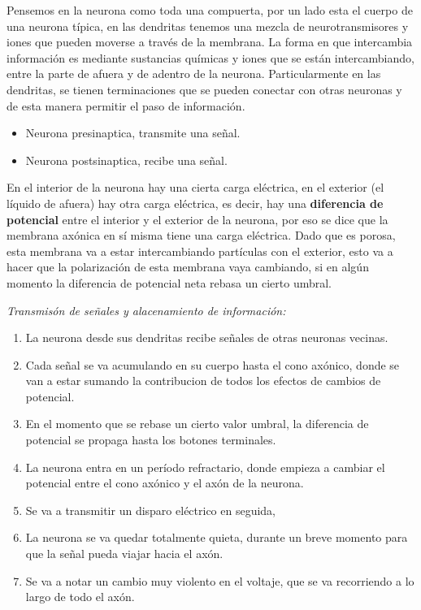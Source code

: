  Pensemos en la neurona como toda una compuerta, por un lado esta el cuerpo de una neurona típica, en las dendritas tenemos una mezcla de neurotransmisores y iones que pueden moverse a través de la membrana. La forma en que intercambia información es mediante sustancias químicas y iones que se están intercambiando, entre la parte de afuera y de adentro de la neurona. Particularmente en las dendritas, se tienen terminaciones que se pueden conectar con otras neuronas y de esta manera permitir el paso de información. 
 
 \begin{itemize}
  \item Neurona presinaptica, transmite una señal.
  \item Neurona postsinaptica, recibe una señal.
 \end{itemize}  
 
En el interior de la neurona hay una cierta carga eléctrica, en el exterior (el líquido de afuera) hay otra carga eléctrica, es decir, hay una \textbf{diferencia de potencial} entre el interior y el exterior de la neurona, por eso se dice que la membrana axónica en sí misma tiene una carga eléctrica. Dado que es porosa, esta membrana  va a estar intercambiando partículas con el exterior, esto va a hacer que la polarización de esta membrana vaya cambiando, si en algún momento la diferencia de potencial neta rebasa un cierto umbral.


\emph{Transmisón de señales y alacenamiento de información:}

\begin{enumerate}
 \item La neurona desde sus dendritas recibe señales de otras neuronas vecinas.
 \item Cada señal se va acumulando en su cuerpo hasta el cono axónico, donde se van a estar sumando la contribucion de todos los efectos de cambios de potencial.
 \item En el momento que se rebase un cierto valor umbral, la diferencia de potencial se propaga hasta los botones terminales.
 \item La neurona entra en un período refractario, donde empieza a cambiar el potencial entre el cono axónico y el axón de la neurona.
 \item Se va a transmitir un disparo eléctrico en seguida,
 \item La neurona se va quedar totalmente quieta, durante un breve momento para que la señal pueda viajar hacia el axón.
 \item Se va a notar un cambio muy violento en el voltaje, que se va recorriendo a lo largo de todo el axón. 
\end{enumerate}


